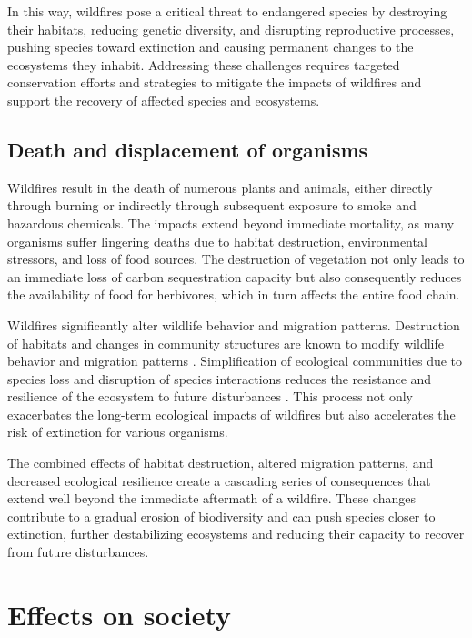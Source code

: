 \documentclass[
  12 pt,
]{Nemilov}
\begin{document}
In this way, wildfires pose a critical threat to endangered species by destroying their habitats, reducing genetic diversity, and disrupting reproductive processes, pushing species toward extinction and causing permanent changes to the ecosystems they inhabit. Addressing these challenges requires targeted conservation efforts and strategies to mitigate the impacts of wildfires and support the recovery of affected species and ecosystems.

\subsection{Death and displacement of organisms}\label{death-and-displacement-of-organisms}

Wildfires result in the death of numerous plants and animals, either directly through burning or indirectly through subsequent exposure to smoke and hazardous chemicals. The impacts extend beyond immediate mortality, as many organisms suffer lingering deaths due to habitat destruction, environmental stressors, and loss of food sources. The destruction of vegetation not only leads to an immediate loss of carbon sequestration capacity but also consequently reduces the availability of food for herbivores, which in turn affects the entire food chain.

Wildfires significantly alter wildlife behavior and migration patterns. Destruction of habitats and changes in community structures are known to modify wildlife behavior \citep{sanderfoot2021ARO} and migration patterns \citep{lewis2022mixed, overton2022megafires}. Simplification of ecological communities due to species loss and disruption of species interactions reduces the resistance and resilience of the ecosystem to future disturbances \citep{brehme2011wildfires, davies2012trajectories, mcwethy2019rethinking}. This process not only exacerbates the long-term ecological impacts of wildfires but also accelerates the risk of extinction for various organisms.

The combined effects of habitat destruction, altered migration patterns, and decreased ecological resilience create a cascading series of consequences that extend well beyond the immediate aftermath of a wildfire. These changes contribute to a gradual erosion of biodiversity and can push species closer to extinction, further destabilizing ecosystems and reducing their capacity to recover from future disturbances.

\section{Effects on society}\label{effects-on-society}
\end{document}
